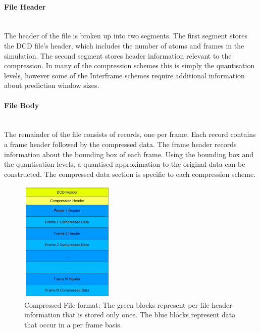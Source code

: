 \documentclass[a4paper,11pt]{report}
\begin{document}
\paragraph{File Header}
\ \\
The header of the file is broken up into two segments. The first segment stores the DCD file's header, which includes the number of atoms and frames in the simulation. The second segment stores header information relevant to the compression. In many of the compression schemes this is simply the quantisation levels, however some of the Interframe schemes require additional information about prediction window sizes.

\paragraph{File Body} 
\ \\
The remainder of the file consists of records, one per frame. Each record contains a frame header followed by the compressed data. The frame header records information about the bounding box of each frame. Using the bounding box and the quantisation levels, a quantised approximation to the original data can be constructed. The compressed data section is specific to each compression scheme.

\begin{figure}
 \center
 \includegraphics[width=0.4\textwidth]{resources/FileFormat.png}
\caption{Compressed File format: The green blocks represent per-file header information that is stored only once. The blue blocks represent data that occur in a per frame basis.}
\label{fileformat}
\end{figure}

\end{document}
